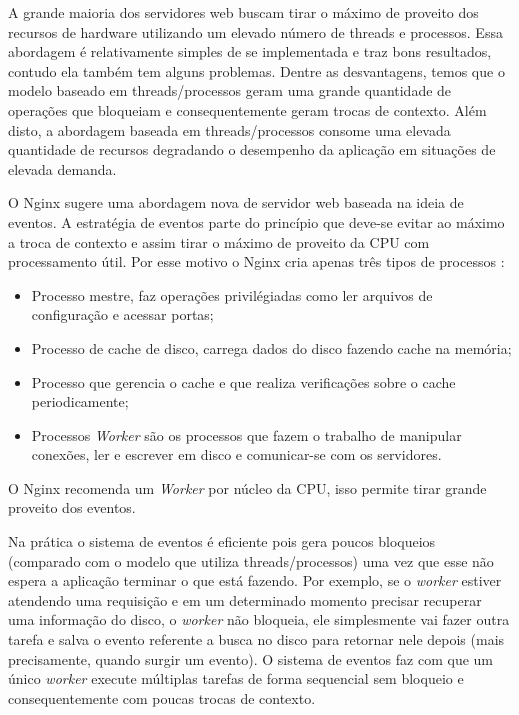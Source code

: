 A grande maioria dos servidores web buscam tirar o máximo de proveito dos recursos
de hardware utilizando um elevado número de threads e processos. Essa abordagem
é relativamente simples de se implementada e traz bons resultados, contudo ela
também tem alguns problemas. Dentre as desvantagens, temos que o modelo baseado
em threads/processos geram uma grande quantidade de operações que bloqueiam e
consequentemente geram trocas de contexto. Além disto, a abordagem baseada em
threads/processos consome uma elevada quantidade de recursos degradando o
desempenho da aplicação em situações de elevada demanda.

O Nginx sugere uma abordagem nova de servidor web baseada na ideia de eventos.
A estratégia de eventos parte do princípio que deve-se evitar ao máximo a troca
de contexto e assim tirar o máximo de proveito da CPU com processamento útil.
Por esse motivo o Nginx cria apenas três tipos de processos
\citep{nginx_architecture}:

\begin{itemize}
  \item Processo mestre, faz operações privilégiadas como ler arquivos de configuração e acessar portas;
  \item Processo de cache de disco, carrega dados do disco fazendo cache na memória;
  \item Processo que gerencia o cache e que realiza verificações sobre o cache periodicamente;
  \item Processos \textit{Worker} são os processos que fazem o trabalho de manipular conexões, ler e escrever em disco e comunicar-se com os servidores.
\end{itemize}

O Nginx recomenda um \textit{Worker} por núcleo da CPU, isso permite tirar
grande proveito dos eventos.

Na prática o sistema de eventos é eficiente pois gera poucos bloqueios
(comparado com o modelo que utiliza threads/processos) uma vez que esse não
espera a aplicação terminar o que está fazendo. Por exemplo, se o
\textit{worker} estiver atendendo uma requisição e em um determinado momento
precisar recuperar uma informação do disco, o \textit{worker} não bloqueia, ele
simplesmente vai fazer outra tarefa e salva o evento referente a busca no disco
para retornar nele depois (mais precisamente, quando surgir um evento). O
sistema de eventos faz com que um único \textit{worker} execute múltiplas
tarefas de forma sequencial sem bloqueio e consequentemente com poucas trocas
de contexto.

